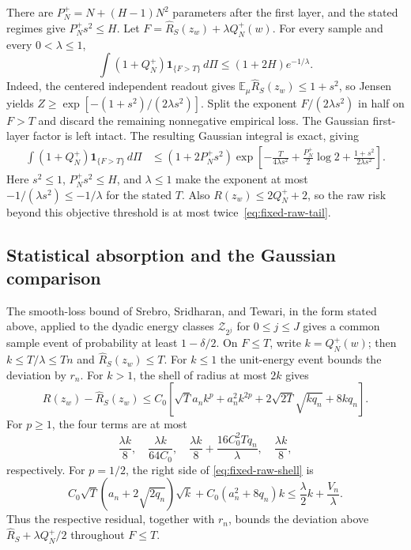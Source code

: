There are $P_N^+=N+(H-1)N^2$ parameters after the first layer, and
the stated regimes give $P_N^+s^2\leq H$.  Let
$F=\widehat R_S(z_w)+\lambda Q_N^+(w)$.
For every sample and every $0<\lambda\leq1$,
\begin{equation}
 \int(1+Q_N^+)\mathbf1_{\{F>T\}}\,d\Pi
     \leq(1+2H)e^{-1/\lambda}.
 \label{eq:fixed-raw-tail}
\end{equation}
Indeed, the centered independent readout gives
$\mathbb E_\mu\widehat R_S(z_w)\leq1+s^2$, so Jensen yields
$Z\geq\exp[-(1+s^2)/(2\lambda s^2)]$.  Split the exponent $F/(2\lambda s^2)$ in half on $F>T$ and discard
the remaining nonnegative empirical loss.  The Gaussian first-layer
factor is left intact.  The resulting Gaussian integral is exact, giving
\begin{align*}
 \int(1+Q_N^+)\mathbf1_{\{F>T\}}\,d\Pi
 &\leq (1+2P_N^+s^2)
 \exp\left[-\frac{T}{4\lambda s^2}
       +\frac{P_N^+}2\log2+\frac{1+s^2}{2\lambda s^2}\right].
\end{align*}
Here $s^2\leq1$, $P_N^+s^2\leq H$, and $\lambda\leq1$ make the
exponent at most $-1/(\lambda s^2)\leq-1/\lambda$ for the stated $T$.
Also $R(z_w)\leq2Q_N^++2$, so the raw risk beyond this objective threshold
is at most twice~\eqref{eq:fixed-raw-tail}.

\subsection{Statistical absorption and the Gaussian comparison}

The smooth-loss bound of Srebro, Sridharan, and Tewari, in the form
stated above, applied to the dyadic energy classes
$\mathcal Z_{2^j}$ for $0\leq j\leq J$ gives a common sample event of
probability at least $1-\delta/2$.  On $F\leq T$, write $k=Q_N^+(w)$;
then $k\leq T/\lambda\leq Tn$ and $\widehat R_S(z_w)\leq T$.
For $k\leq1$ the unit-energy event bounds the deviation by $r_n$.
For $k>1$, the shell of radius at most $2k$ gives
\begin{equation}
 R(z_w)-\widehat R_S(z_w)
 \leq C_0\left[\sqrt T a_nk^p+a_n^2k^{2p}
                   +2\sqrt{2T}\sqrt{kq_n}+8kq_n\right].
 \label{eq:fixed-raw-shell}
\end{equation}
For $p\geq1$, the four terms are at most
\[
 \frac{\lambda k}8,\quad
 \frac{\lambda k}{64C_0},\quad
 \frac{\lambda k}8+\frac{16C_0^2Tq_n}{\lambda},\quad
 \frac{\lambda k}8,
\]
respectively.  For $p=1/2$, the right side of
\eqref{eq:fixed-raw-shell} is
\[
 C_0\sqrt T(a_n+2\sqrt{2q_n})\sqrt k
             +C_0(a_n^2+8q_n)k
 \leq\frac\lambda2 k+\frac{V_n}\lambda.
\]
Thus the respective residual, together with $r_n$, bounds the deviation
above $\widehat R_S+\lambda Q_N^+/2$ throughout $F\leq T$.


